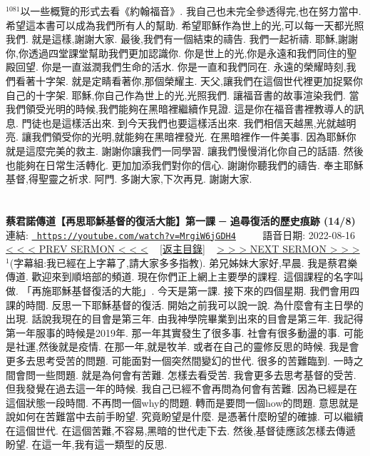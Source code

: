 \documentclass{book}
\begin{document}
$^{1081}$以一些概覽的形式去看《約翰福音》.
我自己也未完全參透得完,也在努力當中.
希望這本書可以成為我們所有人的幫助.
希望耶穌作為世上的光,可以每一天都光照我們.
就是這樣,謝謝大家.
最後,我們有一個結束的禱告.
我們一起祈禱.
耶穌,謝謝你,你透過四堂課堂幫助我們更加認識你.
你是世上的光,你是永遠和我們同住的聖殿回望.
你是一直滋潤我們生命的活水.
你是一直和我們同在.
永遠的榮耀時刻,我們看著十字架.
就是定睛看著你,那個榮耀主.
天父,讓我們在這個世代裡更加捉緊你自己的十字架.
耶穌,你自己作為世上的光,光照我們.
讓福音書的故事渲染我們.
當我們領受光明的時候,我們能夠在黑暗裡繼續作見證.
這是你在福音書裡教導人的訊息.
門徒也是這樣活出來.
到今天我們也要這樣活出來.
我們相信天越黑,光就越明亮.
讓我們領受你的光明,就能夠在黑暗裡發光.
在黑暗裡作一件美事.
因為耶穌你就是這麼完美的救主.
謝謝你讓我們一同學習.
讓我們慢慢消化你自己的話語.
然後也能夠在日常生活轉化.
更加加添我們對你的信心.
謝謝你聽我們的禱告.
奉主耶穌基督,得聖靈之祈求.
阿門.
多謝大家,下次再見.
謝謝大家.
\newpage



\section{}
\label{sec:MrgiW6jGDH4}
\textbf{蔡君諾傳道【再思耶穌基督的復活大能】第一課 ─ 追尋復活的歷史痕跡 (14/8)}
\newline
\newline
連結: \href{https://youtube.com/watch?v=MrgiW6jGDH4}{\texttt{ https://youtube.com/watch?v=MrgiW6jGDH4}} ~~~~ 語音日期: 2022-08-16 
\newline
\newline
\hyperref[sec:k_cCh3J_U2w]{\small{< < < PREV SERMON < < <}}
~
\hyperref[sec:index]{\small{[返主目錄]}}
~
\hyperref[sec:A3YDD55lCCE]{\small{> > > NEXT SERMON > > >}}
\newline
\newline
$^{1}$(字幕組:我已經在上字幕了,請大家多多指教).
弟兄姊妹大家好,早晨.
我是蔡君樂傳道.
歡迎來到順培部的頻道.
現在你們正上網上主要學的課程.
這個課程的名字叫做.
「再施耶穌基督復活的大能」.
今天是第一課.
接下來的四個星期.
我們會用四課的時間.
反思一下耶穌基督的復活.
開始之前我可以說一說.
為什麼會有主日學的出現.
話說我現在的目會是第三年.
由我神學院畢業到出來的目會是第三年.
我記得第一年服事的時候是2019年.
那一年其實發生了很多事.
社會有很多動盪的事.
可能是社運,然後就是疫情.
在那一年,就是牧羊.
或者在自己的靈修反思的時候.
我是會更多去思考受苦的問題.
可能面對一個突然間變幻的世代.
很多的苦難臨到.
一時之間會問一些問題.
就是為何會有苦難.
怎樣去看受苦.
我會更多去思考基督的受苦.
但我發覺在過去這一年的時候.
我自己已經不會再問為何會有苦難.
因為已經是在這個狀態一段時間.
不再問一個why的問題.
轉而是要問一個how的問題.
意思就是說如何在苦難當中去前手盼望.
究竟盼望是什麼.
是憑著什麼盼望的確據.
可以繼續在這個世代.
在這個苦難,不容易,黑暗的世代走下去.
然後,基督徒應該怎樣去傳遞盼望.
在這一年,我有這一類型的反思.
\end{document}
